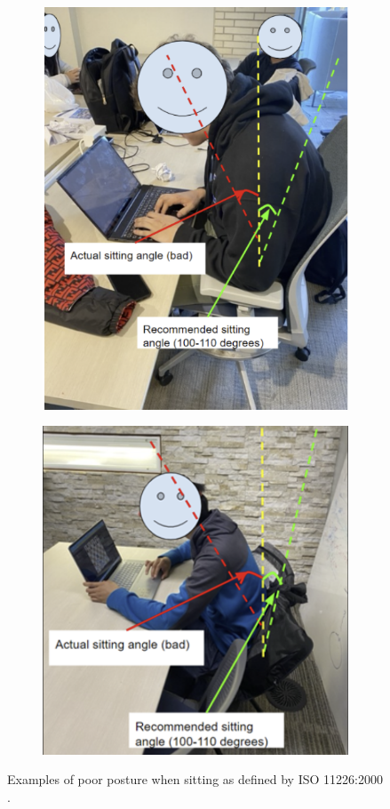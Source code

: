 \documentclass[11pt]{article}
\begin{document}
\begin{figure}[H]
\centering
\begin{subfigure}{.5\linewidth}
  \centering
  \includegraphics[width=0.9\linewidth]{bp1.png}
  \label{fig:sub1}
\end{subfigure}%
\begin{subfigure}{.5\linewidth}
  \centering
  \includegraphics[width=\linewidth]{bp2.png}
  \label{fig:sub2}\end{subfigure}
\caption{Examples of poor posture when sitting as defined by ISO 11226:2000 \cite{RefWorks:32}. }
\label{fig:badPosture}
\end{figure}
\end{document}
